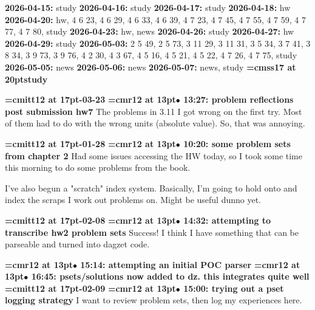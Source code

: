 {\noindent \bf 2026-04-15:} study\smallskip
{\noindent \bf 2026-04-16:} study\smallskip
{\noindent \bf 2026-04-17:} study\smallskip
{\noindent \bf 2026-04-18:} hw\smallskip
{\noindent \bf 2026-04-20:} hw, 4 6 23, 4 6 29, 4 6 33, 4 6 39, 4 7 23, 4 7 45, 4 7 55, 4 7 59, 4 7 77, 4 7 80, study\smallskip
{\noindent \bf 2026-04-23:} hw, news\smallskip
{\noindent \bf 2026-04-26:} study\smallskip
{\noindent \bf 2026-04-27:} hw\smallskip
{\noindent \bf 2026-04-29:} study\smallskip
{\noindent \bf 2026-05-03:} 2 5 49, 2 5 73, 3 11 29, 3 11 31, 3 5 34, 3 7 41, 3 8 34, 3 9 73, 3 9 76, 4 2 30, 4 3 67, 4 5 16, 4 5 21, 4 5 22, 4 7 26, 4 7 75, study\smallskip
{\noindent \bf 2026-05-05:} news\smallskip
{\noindent \bf 2026-05-06:} news\smallskip
{\noindent \bf 2026-05-07:} news, study\smallskip
\vfill \break
{}
{\medskip\noindent\bf\font\titlefont=cmss17 at 20pt\titlefont study}\medskip

{\medskip\noindent\bf\font\titlefont=cmitt12 at 17pt-03-23}\medskip
{\smallskip\noindent\bf\font\titlefont=cmr12 at 13pt\titlefont $\bullet$ 13:27: problem reflections post submission hw7}\smallskip
The problems in 3.11 I got wrong on the first try. Most of them had to do with the wrong units (absolute value). So, that was annoying.
\par

{\medskip\noindent\bf\font\titlefont=cmitt12 at 17pt-01-28}\medskip
{\smallskip\noindent\bf\font\titlefont=cmr12 at 13pt\titlefont $\bullet$ 10:20: some problem sets from chapter 2}\smallskip
Had some issues accessing the HW today, so I took some time this morning to do some problems from the book.
\par

I've also begun a "scratch" index system. Basically, I'm going to hold onto and index the scraps I work out problems on. Might be useful dunno yet.
\par

{\medskip\noindent\bf\font\titlefont=cmitt12 at 17pt-02-08}\medskip
{\smallskip\noindent\bf\font\titlefont=cmr12 at 13pt\titlefont $\bullet$ 14:32: attempting to transcribe hw2 problem sets}\smallskip
Success! I think I have something that can be parseable and turned into dagzet code.
\par

{\smallskip\noindent\bf\font\titlefont=cmr12 at 13pt\titlefont $\bullet$ 15:14: attempting an initial POC parser}\smallskip
{\smallskip\noindent\bf\font\titlefont=cmr12 at 13pt\titlefont $\bullet$ 16:45: psets/solutions now added to dz. this integrates quite well}\smallskip
{\medskip\noindent\bf\font\titlefont=cmitt12 at 17pt-02-09}\medskip
{\smallskip\noindent\bf\font\titlefont=cmr12 at 13pt\titlefont $\bullet$ 15:00: trying out a pset logging strategy}\smallskip
I want to review problem sets, then log my experiences here.
\par

